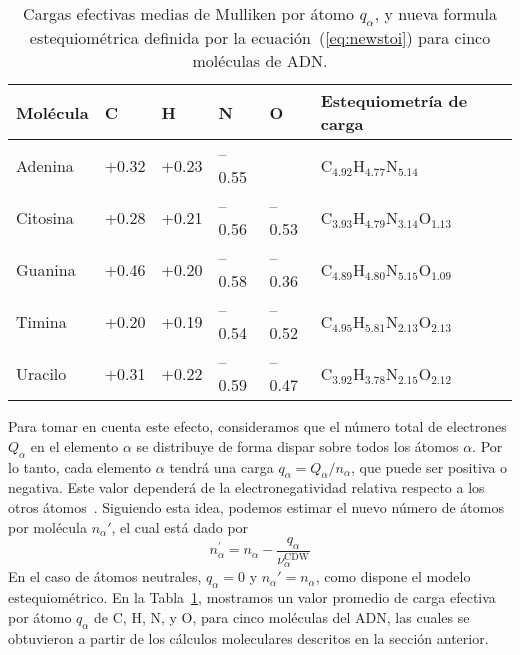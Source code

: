 \begin{table}
\begin{center}
\begin{tabular}{|p{}|p{}|p{}|p{
}|p{}|p{}|}
\hline
Molécula & C & H & N & O & Estequiometría de carga \\
\hline
Adenina & +0.32 & +0.23 & --0.55 &       & 
C$_{4.92}$H$_{4.77}$N$_{5.14}$ \\ 
\hline
Citosina & +0.28 & +0.21 & --0.56 & --0.53 & 
C$_{3.93}$H$_{4.79}$N$_{3.14}$O$_{1.13}$ \\ 
\hline
Guanina & +0.46 & +0.20 & --0.58 & --0.36 & 
C$_{4.89}$H$_{4.80}$N$_{5.15}$O$_{1.09}$ \\ 
\hline
Timina & +0.20 & +0.19 & --0.54 & --0.52 & 
C$_{4.95}$H$_{5.81}$N$_{2.13}$O$_{2.13}$ \\ 
\hline
Uracilo & +0.31 & +0.22 & --0.59 & --0.47 & 
C$_{3.92}$H$_{3.78}$N$_{2.15}$O$_{2.12}$ \\ 
\hline
\end{tabular}
\caption[Cargas efectivas medias de Mulliken por átomo]
{Cargas efectivas medias de Mulliken por átomo $q_{\alpha}$, y nueva formula
estequiométrica definida por la ecuación~(\ref{eq:newstoi}) para cinco
moléculas de ADN.}
\label{tab:newstoi}
\end{center}
\end{table}

Para tomar en cuenta este efecto, consideramos que el número total de 
electrones $Q_{\alpha }$ en el elemento $\alpha$ se distribuye de forma
dispar sobre todos los átomos $\alpha$. Por lo tanto, cada elemento  
$\alpha$ tendrá una carga $q_{\alpha}=Q_{\alpha}/n_{\alpha}$, que puede 
ser positiva o negativa. Este valor dependerá de la electronegatividad 
relativa respecto a los otros átomos~\cite{rappe1991}. Siguiendo esta 
idea, podemos estimar el nuevo número de átomos por molécula 
$n_{\alpha}'$, el cual está dado por 
\begin{equation}
n_{\alpha }^{\prime }=n_{\alpha }-
\frac{q_{\alpha }}{\nu_{\alpha }^{\text{CDW}}}
\label{eq:newstoi}
\end{equation}
En el caso de átomos neutrales, $q_{\alpha}=0$ y $n_{\alpha}'=n_{\alpha}$,
como dispone el modelo estequiométrico. En la Tabla~\ref{tab:newstoi}, 
mostramos un valor promedio de carga efectiva por átomo $q_{\alpha}$ de 
C, H, N, y O, para cinco moléculas del ADN, las cuales se obtuvieron a 
partir de los cálculos moleculares descritos en la sección anterior.

